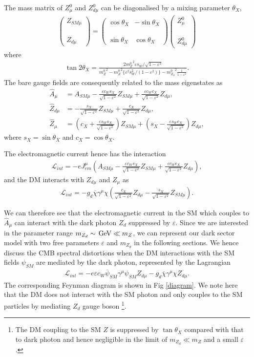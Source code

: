 \documentclass[5p,times]{elsarticle}
\newcommand{\dis}[1]{\begin{equation}\begin{split}#1\end{split}\end{equation}}
\newcommand\ba{\begin{eqnarray}}
\newcommand\ea{\end{eqnarray}}
\newcommand\gev{\,{\rm GeV}}
\begin{document}
The mass matrix of $Z^0_\mu$ and $Z^0_{d\mu}$ can be diagonalised by a mixing parameter $\theta_X$,
\ba
\left( \begin{array}{c} Z_{SM\mu} \\ \phantom{1} \\ Z_{d\mu} \end{array} \right) = \left( \begin{array}{cc} \cos\theta_X & -\sin\theta_X \\ \phantom{1} & \phantom{1} \\ \sin\theta_X & \cos\theta_X \end{array} \right) \left( \begin{array}{c} Z^0_\mu \\ \phantom{1} \\ Z^0_{d\mu} \end{array} \right)
\ea
where \ba\tan2\theta_X=\frac{2{m_Z^0}^2\varepsilon s_W/\sqrt{1-\varepsilon^2}}{{m_Z^0}^2-{m_Z^0}^2\{\varepsilon^2s^2_W/(1-\varepsilon^2)\} -{m_{Z_d}^0}^2\frac{1}{1-\varepsilon^2}}.
\ea
The bare gauge fields are consequently related to the mass eigenstates as
\dis{
\hat{A}_\mu &= A_{SM\mu}-\frac{\varepsilon c_Ws_X}{\sqrt{1-\varepsilon^2}}Z_{SM\mu}+\frac{\varepsilon c_Wc_X}{\sqrt{1-\varepsilon^2}}Z_{d\mu},\\
\hat{Z}_{d\mu} &=-\frac{s_X}{\sqrt{1-\varepsilon^2}}Z_{SM\mu}+\frac{c_X}{\sqrt{1-\varepsilon^2}}Z_{d\mu},\\
\hat{Z}_{\mu} &= \left(c_X+\frac{\varepsilon s_Ws_X}{\sqrt{1-\varepsilon^2}}\right)Z_{SM\mu}+\left(s_X-\frac{\varepsilon s_Wc_X}{\sqrt{1-\varepsilon^2}}\right)Z_{d\mu},
}
where $s_X=\sin \theta_X$ and $c_X=\cos \theta_X$.
   
   
The electromagnetic current hence has the interaction
\dis{
 \mathcal{L}_{int}=-e J^{\mu}_{em}\left( A_{SM\mu} - \frac{\varepsilon c_Ws_X}{\sqrt{1-\varepsilon^2}} Z_{SM \mu}+\frac{\varepsilon c_Wc_X}{\sqrt{1-\varepsilon^2}}Z_{d\mu} \right),
} 
and the DM interacts with $Z_{d\mu}$ and $Z_{\mu}$ as
\dis{
 \mathcal{L}_{int}=-g_d\overline{\chi}\gamma^\mu\chi \left(  \frac{c_X}{\sqrt{1-\varepsilon^2}}Z_{d\mu}  -  \frac{s_X}{\sqrt{1-\varepsilon^2}}Z_{SM\mu}\right).
}


We can therefore see that the electromagnetic current in the SM which couples to $\hat{A}_{\mu}$ can interact with the dark photon $Z_d$ suppressed by $\varepsilon$.
Since we are interested in the parameter range $m_{Z_d}\sim \gev  \ll m_Z$,  
we can represent our dark sector model with two free parameters $\varepsilon$ and $m_{Z_d}$ in the following sections. We hence discuss the CMB spectral distortions when the DM interactions with the SM fields $\psi_{SM}$ are mediated by the dark photon, represented by the Lagrangian
\dis{
 \mathcal{L}_{int}= -e\varepsilon c_W \overline{\psi}_{SM}\gamma^\mu\psi_{SM}  Z_{d\mu}-g_d\overline{\chi}\gamma^\mu\chi  Z_{d\mu} .
}
The corresponding Feynman diagram is shown in Fig \ref{diagram}. 
We note here that the DM does not interact with the SM photon and only couples to the SM particles by mediating $Z_d$ gauge boson \footnote{The DM coupling to the SM $Z$ is suppressed by $\tan\theta_X$ compared with that to dark photon and hence negligible in the limit of $m_{Z_d}\ll m_Z$ and a small $\varepsilon$.}.  
\end{document}

